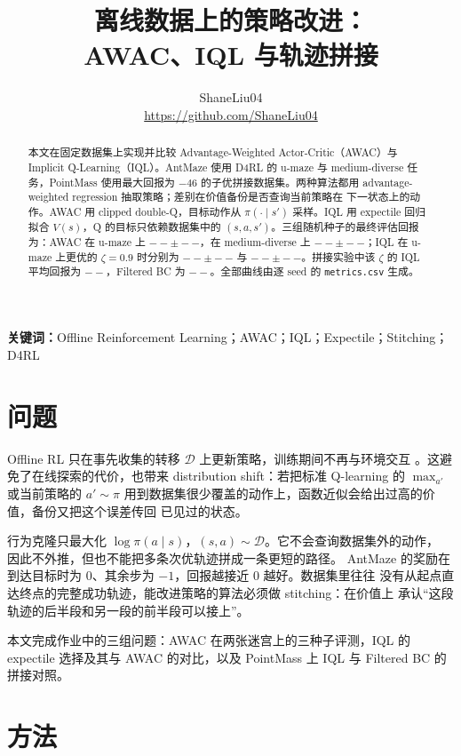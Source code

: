 \documentclass[10pt,twocolumn,a4paper]{ctexart}
\title{\vspace{-1.2em}\textbf{离线数据上的策略改进：\\
AWAC、IQL 与轨迹拼接}}
\author{ShaneLiu04\\
\small\url{https://github.com/ShaneLiu04}}
\date{}
\providecommand{\BestZeta}{0.9}
\providecommand{\IqlBestUmazeMean}{--}\providecommand{\IqlBestUmazeStd}{--}
\providecommand{\IqlBestMediumMean}{--}\providecommand{\IqlBestMediumStd}{--}
\providecommand{\IqlBestStitchMean}{--}\providecommand{\IqlBestStitchStd}{--}
\providecommand{\AwacUmazeMean}{--}\providecommand{\AwacUmazeStd}{--}
\providecommand{\AwacMediumMean}{--}\providecommand{\AwacMediumStd}{--}
\providecommand{\FbcBAStitchMean}{--}\providecommand{\FbcBAStitchStd}{--}
\begin{document}
\maketitle
\thispagestyle{fancy}

\begin{abstract}
本文在固定数据集上实现并比较 Advantage-Weighted Actor-Critic（AWAC）与
Implicit Q-Learning（IQL）。AntMaze 使用 D4RL 的 u-maze 与 medium-diverse
任务，PointMass 使用最大回报为 $-46$ 的子优拼接数据集。两种算法都用
advantage-weighted regression 抽取策略；差别在价值备份是否查询当前策略在
下一状态上的动作。AWAC 用 clipped double-Q，目标动作从 $\pi(\cdot\mid s')$
采样。IQL 用 expectile 回归拟合 $V(s)$，Q 的目标只依赖数据集中的
$(s,a,s')$。三组随机种子的最终评估回报为：AWAC 在 u-maze 上
$\AwacUmazeMean\pm\AwacUmazeStd$，在 medium-diverse 上
$\AwacMediumMean\pm\AwacMediumStd$；IQL 在 u-maze 上更优的
$\zeta=\BestZeta$ 时分别为 $\IqlBestUmazeMean\pm\IqlBestUmazeStd$ 与
$\IqlBestMediumMean\pm\IqlBestMediumStd$。拼接实验中该 $\zeta$ 的 IQL
平均回报为 $\IqlBestStitchMean$，Filtered BC 为 $\FbcBAStitchMean$。全部曲线由逐 seed
的 \texttt{metrics.csv} 生成。
\end{abstract}

\textbf{关键词：}Offline Reinforcement Learning；AWAC；IQL；Expectile；Stitching；D4RL

\section{问题}
Offline RL 只在事先收集的转移 $\mathcal{D}$ 上更新策略，训练期间不再与环境交互
\citep{lange2012batch,levine2020offline}。这避免了在线探索的代价，也带来
distribution shift：若把标准 Q-learning 的 $\max_{a'}$ 或当前策略的 $a'\sim\pi$
用到数据集很少覆盖的动作上，函数近似会给出过高的价值，备份又把这个误差传回
已见过的状态\citep{fujimoto2019bcq,kumar2019bear}。

行为克隆只最大化 $\log\pi(a\mid s)$，$(s,a)\sim\mathcal{D}$。它不会查询数据集外的动作，
因此不外推，但也不能把多条次优轨迹拼成一条更短的路径\citep{pomerleau1991bc}。
AntMaze 的奖励在到达目标时为 $0$、其余步为 $-1$，回报越接近 $0$ 越好。数据集里往往
没有从起点直达终点的完整成功轨迹，能改进策略的算法必须做 stitching：在价值上
承认“这段轨迹的后半段和另一段的前半段可以接上”\citep{fu2020d4rl,kostrikov2022iql}。

本文完成作业中的三组问题：AWAC 在两张迷宫上的三种子评测，IQL 的 expectile
选择及其与 AWAC 的对比，以及 PointMass 上 IQL 与 Filtered BC 的拼接对照。

\section{方法}
\end{document}
